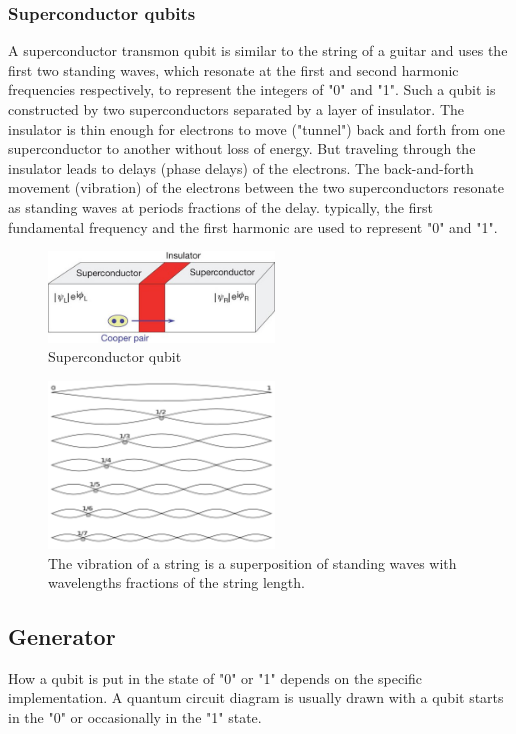 \documentclass{book}
\begin{document}
\subsubsection{Superconductor qubits}
A superconductor transmon qubit is similar to the string of a guitar and uses the first two standing waves, which resonate at the first and second harmonic frequencies respectively, to represent the integers of "0" and "1". Such a qubit is constructed by two superconductors separated by a layer of insulator. The insulator is thin enough for electrons to move ("tunnel") back and forth from one superconductor to another without loss of energy. But traveling through the insulator leads to delays (phase delays) of the electrons. The back-and-forth movement (vibration) of the electrons between the two superconductors resonate as standing waves at periods fractions of the delay. typically, the first fundamental frequency and the first harmonic are used to represent "0" and "1".
\begin{figure}[ht]
\includegraphics[width=6cm]{pic/supercQubit.jpg}
\caption{Superconductor qubit}
\label{Superconductor}
\end{figure}

\begin{figure}[ht]
\includegraphics[width=6cm]{pic/overtones.png}
\caption{The vibration of a string is a superposition of standing waves with wavelengths fractions of the string length.}
\label{Overtones}
\end{figure}

\subsection{Generator}
How a qubit is put in the state of "0" or "1" depends on the specific implementation. A quantum circuit diagram is usually drawn with a qubit starts in the "0" or occasionally in the "1" state.
\end{document}
